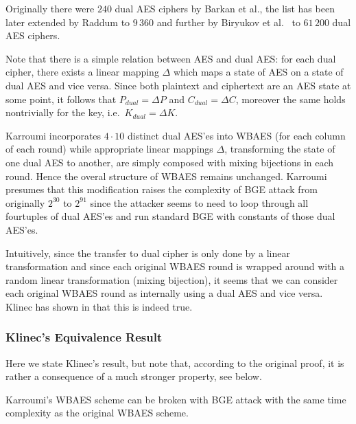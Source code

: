 	Originally there were $240$ dual AES ciphers by Barkan et al., the list has been later extended by Raddum \cite{raddum2004more} to $9\,360$ and further by Biryukov et al.\ \cite{biryukov2003toolbox} to $61\,200$ dual AES ciphers.
	
	Note that there is a simple relation between AES and dual AES: for each dual cipher, there exists a linear mapping $\Delta$ which maps a state of AES on a state of dual AES and vice versa. Since both plaintext and ciphertext are an AES state at some point, it follows that $P_{dual} = \Delta P$ and $C_{dual} = \Delta C$, moreover the same holds nontrivially for the key, i.e.\ $K_{dual} = \Delta K$.
	
	Karroumi incorporates $4\cdot 10$ distinct dual AES'es into WBAES (for each column of each round) while appropriate linear mappings $\Delta$, transforming the state of one dual AES to another, are simply composed with mixing bijections in each round. Hence the overal structure of WBAES remains unchanged. Karroumi presumes that this modification raises the complexity of BGE attack from originally $2^{30}$ to $2^{91}$ since the attacker seems to need to loop through all fourtuples of dual AES'es and run standard BGE with constants of those dual AES'es.
	
	Intuitively, since the transfer to dual cipher is only done by a linear transformation and since each original WBAES round is wrapped around with a random linear transformation (mixing bijection), it seems that we can consider each original WBAES round as internally using a dual AES and vice versa. Klinec has shown in \cite[Proposition~2]{klinec2013white} that this is indeed true.

\subsubsection{Klinec's Equivalence Result}
	
	Here we state Klinec's result, but note that, according to the original proof, it is rather a consequence of a much stronger property, see below.
	
	\begin{prop}[Klinec]
	\label{thm:dualequiv}
		Karroumi's WBAES scheme can be broken with BGE attack with the same time complexity as the original WBAES scheme.
	\end{prop}
	
